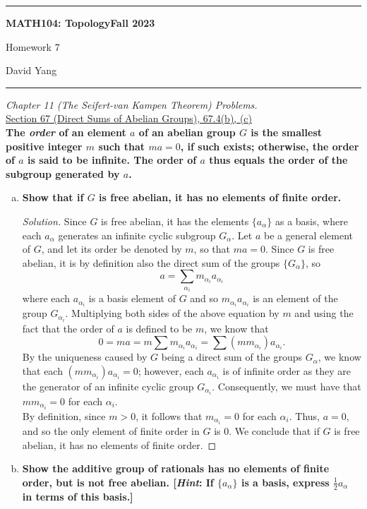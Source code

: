\documentclass[11pt]{article}
\newenvironment{solution}
  {\renewcommand\qedsymbol{$\blacksquare$}\begin{proof}[Solution]}
  {\end{proof}}
\begin{document}
	\hrule
	\begin{center}
        \textbf{MATH104: Topology}\hfill \textbf{Fall 2023}\newline

		{\Large Homework 7}

		David Yang
	\end{center}

\hrule

\vspace{1em}

\textit{Chapter 11 (The Seifert-van Kampen Theorem) Problems.} \\

\underline{Section 67 (Direct Sums of Abelian Groups), 67.4(b), (c)} \\

\textbf{The \textit{order} of an element $a$ of an abelian group $G$ is the smallest positive integer $m$ such that $ma = 0$, if such exists; otherwise, the order of $a$ is said to be infinite.
The order of $a$ thus equals the order of the subgroup generated by $a$.}

\begin{enumerate}[b)]
    \item \textbf{Show that if $G$ is free abelian, it has no elements of finite order.}
    
    \begin{solution}
    Since $G$ is free abelian, it has the elements $\{ a_\alpha \}$ as a basis, where each $a_\alpha$ generates an infinite cyclic subgroup $G_\alpha$. Let $a$ be a general element of $G$, and let its order be denoted by $m$, so that $ma = 0$. Since $G$
    is free abelian, it is by definition also the direct sum of the groups $\{ G_\alpha \}$, so 
    \[
        a = \sum_{\alpha_i} m_{\alpha_i} a_{\alpha_i} 
    \]
    where each $a_{\alpha_i}$ is a basis element of $G$ and so $m_{\alpha_i} a_{\alpha_i}$ is an element of the group $G_{\alpha_i}$. Multiplying both sides of the above equation by $m$ and using the fact that the order of $a$ is defined to be $m$, we know that
    \[
        0 = ma = m \sum m_{\alpha_i} a_{\alpha_i} = \sum (mm_{\alpha_i}) a_{\alpha_i}.
    \]
    By the uniqueness caused by $G$ being a direct sum of the groups $G_\alpha$, we know that each $(mm_{\alpha_i}) a_{\alpha_i} = 0$; however, each $a_{\alpha_i}$ is of infinite order as they are the generator of an infinite cyclic group $G_{\alpha_i}$. 
    Consequently, we must have that $mm_{\alpha_i} = 0$ for each $\alpha_i$. \\

    By definition, since $m > 0$, it follows that $m_{\alpha_i} = 0$ for each $\alpha_i$. Thus, $a = 0$, and so the only element of finite order in $G$ is $0$. We conclude that if $G$ is free abelian, it has no elements of finite order.
    \end{solution}
    \item \textbf{Show the additive group of rationals has no elements of finite order, but is not free abelian. [\textit{Hint}: If $\{ a_\alpha \}$ is a basis, express $\frac{1}{2}a_\alpha$ in terms of this basis.]} 
\end{enumerate}
\end{document}
